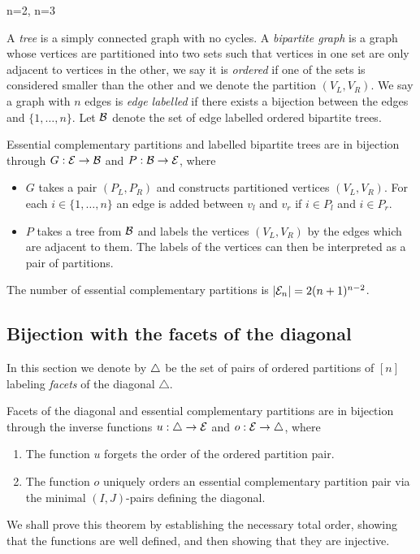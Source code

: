 \begin{example}
n=2, n=3
\end{example}

A \emph{tree} is a simply connected graph with no cycles. 
A \emph{bipartite graph} is a graph whose vertices are partitioned into two sets such that vertices in one set are only adjacent to vertices in the other, we say it is \emph{ordered} if one of the sets is considered smaller than the other and we denote the partition $(V_L,V_R)$. 
We say a graph with $n$ edges is \emph{edge labelled} if there exists a bijection between the edges and $\{1,\dots,n\}$.
Let $\mathcal{B}$ denote the set of edge labelled ordered bipartite trees.

\begin{proposition}  
\label{EC Graph Bijection}
Essential complementary partitions and labelled bipartite trees are in bijection through $G:\mathcal{E} \to \mathcal{B}$ and $P:\mathcal{B} \to \mathcal{E}$, where
\begin{itemize}
    \item $G$ takes a pair $(P_L,P_R)$ and constructs partitioned vertices $(V_L,V_R)$. For each $i \in  \{1,\dots,n\}$ an edge is added between $v_l$ and $v_r$ if $i\in P_l$ and $i \in P_r$. 
    \item $P$ takes a tree from $\mathcal{B}$ and labels the vertices $(V_L,V_R)$ by the edges which are adjacent to them. The labels of the vertices can then be interpreted as a pair of partitions.
\end{itemize}
\end{proposition}

\begin{corollary}
The number of essential complementary partitions is $|\mathcal{E}_n| = 2(n+1)^{n-2}$.
\end{corollary}

\subsection{Bijection with the facets of the diagonal}

In this section we denote by $\triangle$ be the set of pairs of ordered partitions of $[n]$ labeling \emph{facets} of the diagonal $\triangle$.

\begin{thm}
\label{thm:facets}
Facets of the diagonal and essential complementary partitions are in bijection through the inverse functions $u:\triangle \to \mathcal{E}$ and $o:\mathcal{E}\to \triangle$, where
\begin{enumerate}
    \item The function $u$ forgets the order of the ordered partition pair.
    \item The function $o$ uniquely orders an essential complementary partition pair via the minimal $(I,J)$-pairs defining the diagonal. 
\end{enumerate}
\end{thm}
We shall prove this theorem by establishing the necessary total order, showing that the functions are well defined, and then showing that they are injective.

